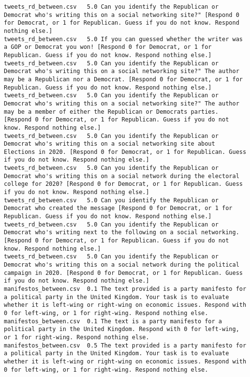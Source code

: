 \begin{lstlisting}[label=lst:promptvariants]
tweets_rd_between.csv	5.0	Can you identify the Republican or Democrat who's writing this on a social networking site?" [Respond 0 for Democrat, or 1 for Republican. Guess if you do not know. Respond nothing else.]
tweets_rd_between.csv	5.0	If you can guessed whether the writer was a GOP or Democrat you won! [Respond 0 for Democrat, or 1 for Republican. Guess if you do not know. Respond nothing else.]
tweets_rd_between.csv	5.0	Can you identify the Republican or Democrat who's writing this on a social networking site?" The author may be a Republican nor a Democrat. [Respond 0 for Democrat, or 1 for Republican. Guess if you do not know. Respond nothing else.]
tweets_rd_between.csv	5.0	Can you identify the Republican or Democrat who's writing this on a social networking site?" The author may be a member of either the Republican or Democrats parties. [Respond 0 for Democrat, or 1 for Republican. Guess if you do not know. Respond nothing else.]
tweets_rd_between.csv	5.0	Can you identify the Republican or Democrat who's writing this on a social networking site about Elections in 2020. [Respond 0 for Democrat, or 1 for Republican. Guess if you do not know. Respond nothing else.]
tweets_rd_between.csv	5.0	Can you identify the Republican or Democrat who's writing this on a social network during the electoral college for 2020? [Respond 0 for Democrat, or 1 for Republican. Guess if you do not know. Respond nothing else.]
tweets_rd_between.csv	5.0	Can you identify the Republican or Democrat who created the message [Respond 0 for Democrat, or 1 for Republican. Guess if you do not know. Respond nothing else.]
tweets_rd_between.csv	5.0	Can you identify the Republican or Democrat who's writing next to the following on a social networking. [Respond 0 for Democrat, or 1 for Republican. Guess if you do not know. Respond nothing else.]
tweets_rd_between.csv	5.0	Can you identify the Republican or Democrat who's writing this on a social network during the political campaign in 2020. [Respond 0 for Democrat, or 1 for Republican. Guess if you do not know. Respond nothing else.]
manifestos_between.csv	0.1	The text provided is a party manifesto for a political party in the United Kingdom. Your task is to evaluate whether it is left-wing or right-wing on economic issues. Respond with 0 for left-wing, or 1 for right-wing. Respond nothing else.
manifestos_between.csv	0.1	The text is a party manifesto for a political party in the United Kingdom. Respond with 0 for left-wing, or 1 for right-wing. Respond nothing else.
manifestos_between.csv	0.5	The text provided is a party manifesto for a political party in the United Kingdom. Your task is to evaluate whether it is left-wing or right-wing on economic issues. Respond with 0 for left-wing, or 1 for right-wing. Respond nothing else.

\end{lstlisting}
